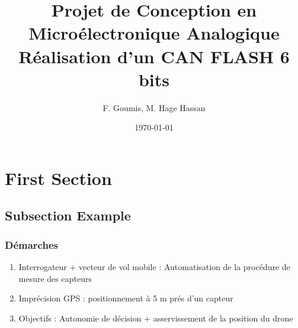 \documentclass{beamer}
\title[Projet Micro\'electronique 2A SEI]{Projet de Conception en Micro\'electronique Analogique \\ R\'ealisation d'un CAN FLASH 6 bits }
\author{F. Goumis, M. Hage Hassan} %
\institute[Phelma] %
{
Institut Polytechnique de Grenoble - Phelma\\ %
\medskip
\textit{mohamed.hage-hassan@phelma.grenoble-inp.fr}\\ %
\textit{ferdinand.goumis@phelma.grenoble-inp.fr}
}
\date{\today} %
\begin{document}
\begin{frame}
\titlepage %
\end{frame}


\section{First Section} %

\subsection{Subsection Example} %





\begin{frame}
\frametitle{D\'emarches}

\begin{enumerate}

\item Interrogateur  + vecteur de vol mobile : Automatisation de la proc\'edure de mesure des capteurs

\item Impr\'ecision GPS : positionnement \`a 5 m pr\'es d'un capteur
\item Objectifs : Autonomie de d\'ecision + asservissement de la position du drone

\end{enumerate}

\end{frame}
\end{document}
